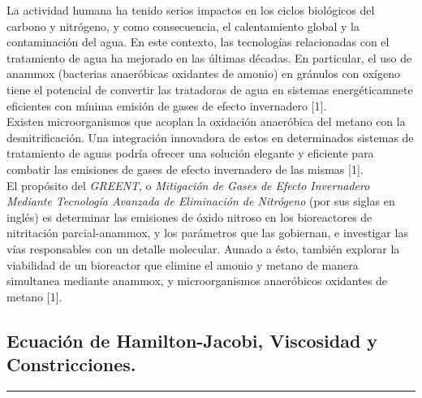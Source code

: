 \documentclass[letterpaper]{article}
\begin{document}
{{{                \normalsize{La  actividad humana ha tenido serios impactos en los ciclos biológicos del carbono y nitrógeno, y como consecuencia, el calentamiento global y la contaminación del agua. En este contexto, las tecnologías relacionadas con el tratamiento de agua ha mejorado en las últimas décadas. En particular, el uso de anammox (bacterias anaeróbicas oxidantes de amonio) en gránulos con oxígeno tiene el potencial de convertir las tratadoras de agua en sistemas energéticamnete eficientes con mínima emisión de gases de efecto invernadero [1].}\\

                \normalsize{Existen microorganismos que acoplan la oxidación anaeróbica del metano con la desnitrificación. Una integración innovadora de estos en determinados sistemas de tratamiento de aguas podría ofrecer una solución elegante y eficiente para combatir las emisiones de gases de efecto invernadero de las mismas [1].}\\
                
                \normalsize{El propósito del \textit{GREENT}, o \textit{Mitigación de Gases de Efecto Invernadero Mediante Tecnología Avanzada de Eliminación de Nitrógeno} (por sus siglas en inglés) es determinar las emisiones de óxido nitroso en los bioreactores de nitritación parcial-anammox, y los parámetros que las gobiernan, e investigar las vías responsables con un detalle molecular. Aunado a ésto, también explorar la viabilidad de un bioreactor que elimine el amonio y metano de manera simultanea mediante anammox, y microorganismos anaeróbicos oxidantes de metano [1].}
            
            }
        
        }

        \subsection{Ecuación de Hamilton-Jacobi, Viscosidad y Constricciones.}
    
    }

    \vspace{0.2cm}
        \rule{150mm}{0.5mm} %
    \vspace{0.2cm}
\end{document}
